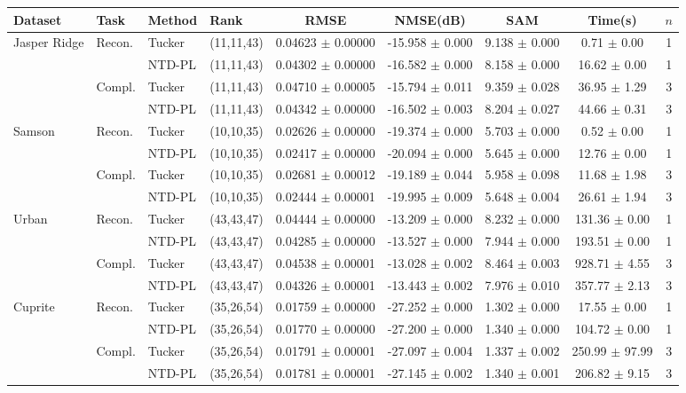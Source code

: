 \begin{tabular}{l l l l c c c c c}
    \toprule
    Dataset & Task & Method & Rank & RMSE & NMSE(dB) & SAM & Time(s) & $n$ \\
    \midrule
    Jasper Ridge & Recon. & Tucker & (11,11,43) & 0.04623 $\pm$ 0.00000 & -15.958 $\pm$ 0.000 & 9.138 $\pm$ 0.000 & 0.71 $\pm$ 0.00 & 1 \\
     &  & NTD-PL & (11,11,43) & 0.04302 $\pm$ 0.00000 & -16.582 $\pm$ 0.000 & 8.158 $\pm$ 0.000 & 16.62 $\pm$ 0.00 & 1 \\
    \midrule
     & Compl. & Tucker & (11,11,43) & 0.04710 $\pm$ 0.00005 & -15.794 $\pm$ 0.011 & 9.359 $\pm$ 0.028 & 36.95 $\pm$ 1.29 & 3 \\
     &  & NTD-PL & (11,11,43) & 0.04342 $\pm$ 0.00000 & -16.502 $\pm$ 0.003 & 8.204 $\pm$ 0.027 & 44.66 $\pm$ 0.31 & 3 \\
    \midrule
    Samson & Recon. & Tucker & (10,10,35) & 0.02626 $\pm$ 0.00000 & -19.374 $\pm$ 0.000 & 5.703 $\pm$ 0.000 & 0.52 $\pm$ 0.00 & 1 \\
     &  & NTD-PL & (10,10,35) & 0.02417 $\pm$ 0.00000 & -20.094 $\pm$ 0.000 & 5.645 $\pm$ 0.000 & 12.76 $\pm$ 0.00 & 1 \\
    \midrule
     & Compl. & Tucker & (10,10,35) & 0.02681 $\pm$ 0.00012 & -19.189 $\pm$ 0.044 & 5.958 $\pm$ 0.098 & 11.68 $\pm$ 1.98 & 3 \\
     &  & NTD-PL & (10,10,35) & 0.02444 $\pm$ 0.00001 & -19.995 $\pm$ 0.009 & 5.648 $\pm$ 0.004 & 26.61 $\pm$ 1.94 & 3 \\
    \midrule
    Urban & Recon. & Tucker & (43,43,47) & 0.04444 $\pm$ 0.00000 & -13.209 $\pm$ 0.000 & 8.232 $\pm$ 0.000 & 131.36 $\pm$ 0.00 & 1 \\
     &  & NTD-PL & (43,43,47) & 0.04285 $\pm$ 0.00000 & -13.527 $\pm$ 0.000 & 7.944 $\pm$ 0.000 & 193.51 $\pm$ 0.00 & 1 \\
    \midrule
     & Compl. & Tucker & (43,43,47) & 0.04538 $\pm$ 0.00001 & -13.028 $\pm$ 0.002 & 8.464 $\pm$ 0.003 & 928.71 $\pm$ 4.55 & 3 \\
     &  & NTD-PL & (43,43,47) & 0.04326 $\pm$ 0.00001 & -13.443 $\pm$ 0.002 & 7.976 $\pm$ 0.010 & 357.77 $\pm$ 2.13 & 3 \\
    \midrule
    Cuprite & Recon. & Tucker & (35,26,54) & 0.01759 $\pm$ 0.00000 & -27.252 $\pm$ 0.000 & 1.302 $\pm$ 0.000 & 17.55 $\pm$ 0.00 & 1 \\
     &  & NTD-PL & (35,26,54) & 0.01770 $\pm$ 0.00000 & -27.200 $\pm$ 0.000 & 1.340 $\pm$ 0.000 & 104.72 $\pm$ 0.00 & 1 \\
    \midrule
     & Compl. & Tucker & (35,26,54) & 0.01791 $\pm$ 0.00001 & -27.097 $\pm$ 0.004 & 1.337 $\pm$ 0.002 & 250.99 $\pm$ 97.99 & 3 \\
     &  & NTD-PL & (35,26,54) & 0.01781 $\pm$ 0.00001 & -27.145 $\pm$ 0.002 & 1.340 $\pm$ 0.001 & 206.82 $\pm$ 9.15 & 3 \\
    \bottomrule
\end{tabular}

